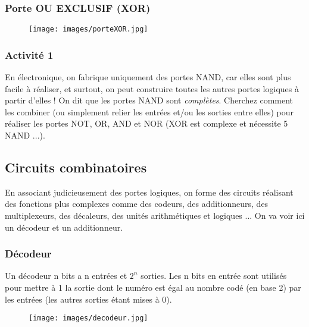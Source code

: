 \documentclass[11pt,a4paper,french,twoside]{PMCours}
\begin{document}
\subsubsection{Porte OU EXCLUSIF (XOR)}

\begin{center}
\begin{figure}[ht]
\centering
\texttt{[image: images/porteXOR.jpg]}
\end{figure}
\end{center}



\subsubsection*{Activité 1}

En électronique, on fabrique uniquement des portes NAND, car elles sont plus facile à réaliser, et surtout, on peut construire toutes les autres portes logiques à partir d'elles ! On dit que les portes NAND sont \emph{complètes}. Cherchez comment les combiner (ou simplement relier les entrées et/ou les sorties entre elles) pour réaliser les portes NOT, OR, AND et NOR (XOR est complexe et nécessite 5 NAND ...).


\subsection{Circuits combinatoires}

En associant judicieusement des portes logiques, on forme des circuits réalisant des fonctions plus complexes comme des codeurs, des additionneurs, des multiplexeurs, des décaleurs, des unités arithmétiques et logiques ... On va voir ici un décodeur et un additionneur.

\subsubsection{Décodeur}

Un décodeur n bits a n entrées et $2^n$ sorties. Les n bits en entrée sont utilisés pour mettre à 1 la sortie dont le numéro est égal au nombre codé (en base 2) par les entrées (les autres sorties étant mises à 0).

\begin{center}
\begin{figure}[ht]
\centering
\texttt{[image: images/decodeur.jpg]}
\end{figure}
\end{center}
\end{document}
